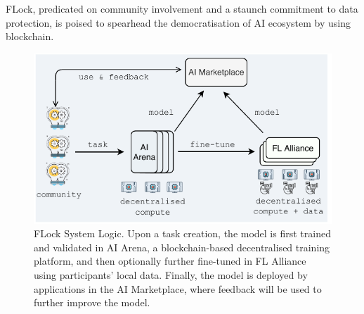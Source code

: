 \documentclass[conference]{IEEEtran}
\begin{document}
FLock, predicated on community involvement and a staunch commitment to data protection, is poised to spearhead the democratisation of AI ecosystem by using blockchain.


\begin{figure}[t]
\centering
\includegraphics[width=\columnwidth]{figures/flock-snt-fl.pdf}
\caption{FLock System Logic. Upon a task creation, the model is first trained and validated in AI Arena, a blockchain-based decentralised training platform, and then optionally further fine-tuned in FL Alliance using participants' local data. Finally, the model is deployed by applications in the AI Marketplace, where feedback will be used to further improve the model.}
\label{fig:FLock-system-logic}
\end{figure}
\end{document}
